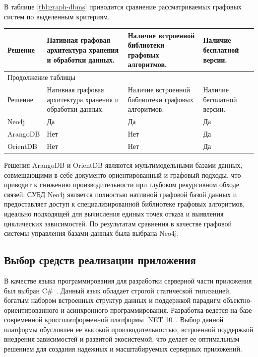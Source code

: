 В таблице \ref{tbl:graph-dbms} приводится сравнение рассматриваемых графовых систем по выделенным критериям.

\begin{center}
    \begin{tabularx}{\textwidth}{|X|X|X|X|}
        \caption{\label{tbl:graph-dbms}Сравнение графовых систем управления базами данных} \\ \hline
        Решение & 
        Нативная графовая архитектура хранения и обработки данных. & 
        Наличие встроенной библиотеки графовых алгоритмов. & 
        Наличие бесплатной версии. \\ \hline
        \endfirsthead

        \multicolumn{4}{l}{{Продолжение таблицы\ \thetable{}}} \\ \hline
        Решение & 
        Нативная графовая архитектура хранения и обработки данных. & 
        Наличие встроенной библиотеки графовых алгоритмов. & 
        Наличие бесплатной версии. \\ \hline
        \endhead

        \endfoot
        \endlastfoot

        Neo4j & Да & Да & Да \\ \hline
        ArangoDB & Нет & Нет & Да \\ \hline
        OrientDB & Нет & Нет & Да \\ \hline
    \end{tabularx}
\end{center}

Решения ArangoDB и OrientDB являются мультимодельными базами данных, 
совмещающими в себе документо-ориентированный и графовый подходы, что 
приводит к снижению производительности при глубоком рекурсивном обходе связей. 
СУБД Neo4j является полностью нативной графовой базой данных и предоставляет 
доступ к специализированной библиотеке графовых алгоритмов, идеально 
подходящей для вычисления единых точек отказа и выявления циклических 
зависимостей. По результатам сравнения в качестве графовой системы управления 
базами данных была выбрана Neo4j.

\subsection{Выбор средств реализации приложения}
В качестве языка программирования для разработки серверной части 
приложения был выбран C\#~\cite{ref:csharp}. Данный язык обладает строгой статической типизацией, 
богатым набором встроенных структур данных и поддержкой парадигм 
объектно-ориентированного и асинхронного программирования. Разработка ведется 
на базе современной кроссплатформенной платформы .NET 10~\cite{ref:net10}. Выбор данной 
платформы обусловлен ее высокой производительностью, встроенной поддержкой 
внедрения зависимостей и развитой экосистемой, что делает ее оптимальным 
решением для создания надежных и масштабируемых серверных приложений.

